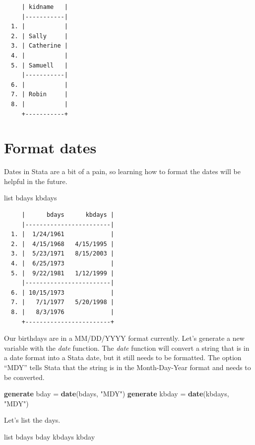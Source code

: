 \documentclass[
]{book}
\newenvironment{Shaded}{\begin{snugshade}}{\end{snugshade}}
\newcommand{\FunctionTok}[1]{\textcolor[rgb]{0.13,0.29,0.53}{\textbf{#1}}}
\newcommand{\KeywordTok}[1]{\textcolor[rgb]{0.13,0.29,0.53}{\textbf{#1}}}
\newcommand{\NormalTok}[1]{#1}
\newcommand{\OtherTok}[1]{\textcolor[rgb]{0.56,0.35,0.01}{#1}}
\newcommand{\StringTok}[1]{\textcolor[rgb]{0.31,0.60,0.02}{#1}}
\begin{document}
\begin{verbatim}
     | kidname   |
     |-----------|
  1. |           |
  2. | Sally     |
  3. | Catherine |
  4. |           |
  5. | Samuell   |
     |-----------|
  6. |           |
  7. | Robin     |
  8. |           |
     +-----------+
\end{verbatim}

\section{Format dates}\label{format-dates}

Dates in Stata are a bit of a pain, so learning how to format the dates will be helpful in the future.

\begin{Shaded}
\begin{Highlighting}[]
\OtherTok{list}\NormalTok{ bdays kbdays}
\end{Highlighting}
\end{Shaded}

\begin{verbatim}
     |      bdays      kbdays |
     |------------------------|
  1. |  1/24/1961             |
  2. |  4/15/1968   4/15/1995 |
  3. |  5/23/1971   8/15/2003 |
  4. |  6/25/1973             |
  5. |  9/22/1981   1/12/1999 |
     |------------------------|
  6. | 10/15/1973             |
  7. |   7/1/1977   5/20/1998 |
  8. |   8/3/1976             |
     +------------------------+
\end{verbatim}

Our birthdays are in a MM/DD/YYYY format currently. Let's generate a new variable with the \emph{date} function. The \emph{date} function will convert a string that is in a date format into a Stata date, but it still needs to be formatted. The option ``MDY'' tells Stata that the string is in the Month-Day-Year format and needs to be converted.

\begin{Shaded}
\begin{Highlighting}[]
\KeywordTok{generate}\NormalTok{ bday = }\FunctionTok{date}\NormalTok{(bdays, }\StringTok{"MDY"}\NormalTok{)}
\KeywordTok{generate}\NormalTok{ kbday = }\FunctionTok{date}\NormalTok{(kbdays, }\StringTok{"MDY"}\NormalTok{)}
\end{Highlighting}
\end{Shaded}

Let's list the days.

\begin{Shaded}
\begin{Highlighting}[]
\OtherTok{list}\NormalTok{ bdays bday kbdays kbday}
\end{Highlighting}
\end{Shaded}
\end{document}
